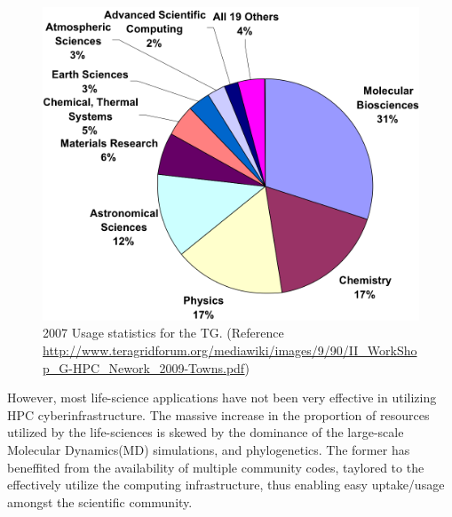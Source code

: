 \documentclass[]{svjour3}
\begin{document}



\begin{figure}
 \centering
\includegraphics[scale=0.40]{figures/teragrid-discipline07}
\caption{\small 2007 Usage statistics for the TG. (Reference
  \url{http://www.teragridforum.org/mediawiki/images/9/90/II_WorkShop_G-HPC_Nework_2009-Towns.pdf})}
  \label{tg2007}
\end{figure}

However, most life-science applications have not been very effective
in utilizing HPC cyberinfrastructure. The massive increase in the
proportion of resources utilized by the life-sciences is skewed by the
dominance of the large-scale Molecular Dynamics(MD) simulations, and
phylogenetics.  %
The former has beneffited from the availability of multiple community
codes, taylored to the effectively utilize the computing
infrastructure, thus enabling easy uptake/usage amongst the scientific
community.
\end{document}
